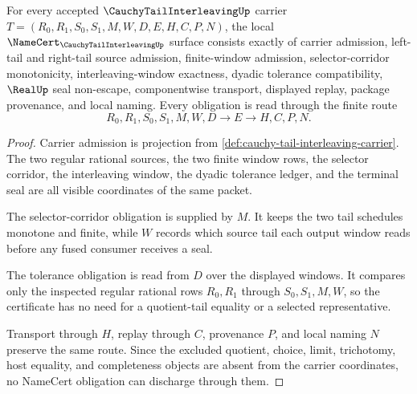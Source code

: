 \begin{theorem}
\label{thm:cauchy-tail-interleaving-namecert-obligations}
For every accepted $\CauchyTailInterleavingUp$ carrier $T=(R_0,R_1,S_0,S_1,M,W,D,E,H,C,P,N)$, the local $\NameCert_{\CauchyTailInterleavingUp}$ surface consists exactly of carrier admission, left-tail and right-tail source admission, finite-window admission, selector-corridor monotonicity, interleaving-window exactness, dyadic tolerance compatibility, $\RealUp$ seal non-escape, componentwise transport, displayed replay, package provenance, and local naming. Every obligation is read through the finite route
$$
R_0,R_1,S_0,S_1,M,W,D \longrightarrow E \longrightarrow H,C,P,N .
$$
\end{theorem}
\begin{proof}
Carrier admission is projection from \autoref{def:cauchy-tail-interleaving-carrier}. The two regular rational sources, the two finite window rows, the selector corridor, the interleaving window, the dyadic tolerance ledger, and the terminal seal are all visible coordinates of the same packet.

The selector-corridor obligation is supplied by $M$. It keeps the two tail schedules monotone and finite, while $W$ records which source tail each output window reads before any fused consumer receives a seal.

The tolerance obligation is read from $D$ over the displayed windows. It compares only the inspected regular rational rows $R_0,R_1$ through $S_0,S_1,M,W$, so the certificate has no need for a quotient-tail equality or a selected representative.

Transport through $H$, replay through $C$, provenance $P$, and local naming $N$ preserve the same route. Since the excluded quotient, choice, limit, trichotomy, host equality, and completeness objects are absent from the carrier coordinates, no NameCert obligation can discharge through them.
\end{proof}

